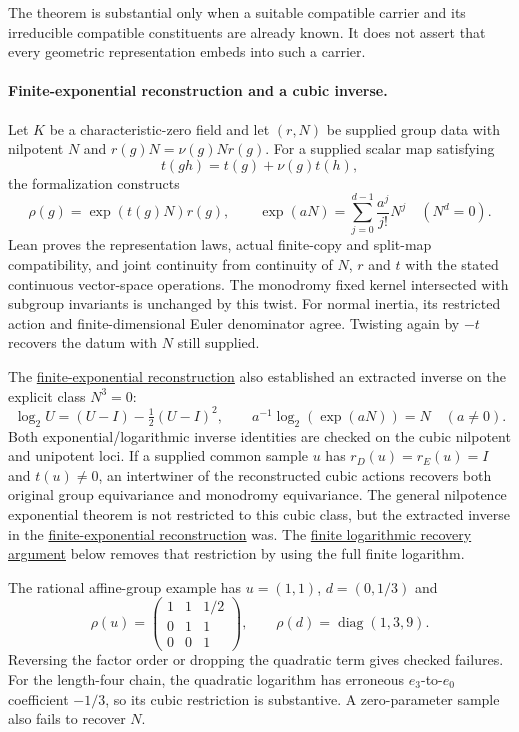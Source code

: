 \documentclass[11pt]{article}
\theoremstyle{definition}
\theoremstyle{remark}
\begin{document}
The theorem is substantial only when a suitable compatible carrier and its irreducible compatible constituents are already known.  It does not assert that every geometric representation embeds into such a carrier.


\paragraph{Finite-exponential reconstruction and a cubic inverse.}\label{book:x-construction-13}
Let $K$ be a characteristic-zero field and let $(r,N)$ be supplied group data
with nilpotent $N$ and $r(g)N=\nu(g)Nr(g)$. For a supplied scalar map satisfying
\[
t(gh)=t(g)+\nu(g)t(h),
\]
the formalization constructs
\[
\rho(g)=\exp(t(g)N)r(g),\qquad
\exp(aN)=\sum_{j=0}^{d-1}\frac{a^j}{j!}N^j\quad(N^d=0).
\]
Lean proves the representation laws, actual finite-copy and split-map
compatibility, and joint continuity from continuity of $N$, $r$ and $t$ with
the stated continuous vector-space operations. The monodromy fixed kernel
intersected with subgroup invariants is unchanged by this twist. For normal
inertia, its restricted action and finite-dimensional Euler denominator agree.
Twisting again by $-t$ recovers the datum with $N$ still supplied.

The \hyperref[book:x-construction-13]{finite-exponential reconstruction} also established an extracted inverse on the explicit class $N^3=0$:
\[
\log_2 U=(U-I)-\tfrac12(U-I)^2,\qquad
 a^{-1}\log_2(\exp(aN))=N\quad(a\ne0).
\]
Both exponential/logarithmic inverse identities are checked on the cubic
nilpotent and unipotent loci. If a supplied common sample $u$ has
$r_D(u)=r_E(u)=I$ and $t(u)\ne0$, an intertwiner of the reconstructed cubic
actions recovers both original group equivariance and monodromy equivariance.
The general nilpotence exponential theorem is not restricted to this cubic
class, but the extracted inverse in the \hyperref[book:x-construction-13]{finite-exponential reconstruction} was. The \hyperref[book:x-construction-20]{finite logarithmic recovery argument} below removes
that restriction by using the full finite logarithm.

The rational affine-group example has $u=(1,1)$, $d=(0,1/3)$ and
\[
\rho(u)=\begin{pmatrix}1&1&1/2\\0&1&1\\0&0&1\end{pmatrix},
\qquad \rho(d)=\operatorname{diag}(1,3,9).
\]
Reversing the factor order or dropping the quadratic term gives checked
failures. For the length-four chain, the quadratic logarithm has erroneous
$e_3$-to-$e_0$ coefficient $-1/3$, so its cubic restriction is substantive.
A zero-parameter sample also fails to recover $N$.
\end{document}
